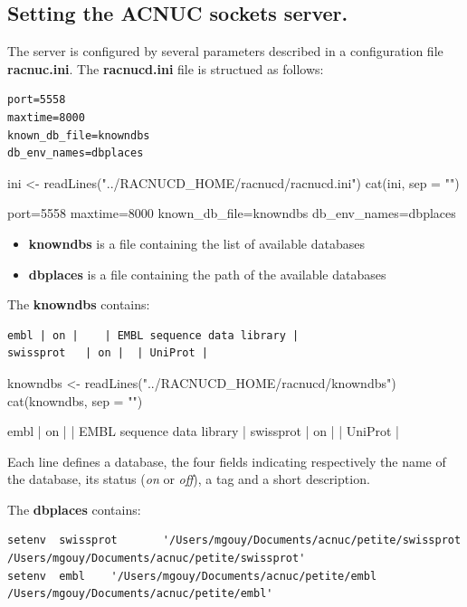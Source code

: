 \documentclass{article}
\begin{document}
\subsection{Setting the ACNUC sockets server.}
The server is configured by several parameters described in a configuration file \textbf{racnuc.ini}.
The \textbf{racnucd.ini} file is structued as follows:

\begin{verbatim}
port=5558
maxtime=8000
known_db_file=knowndbs
db_env_names=dbplaces
\end{verbatim}

\begin{Schunk}
\begin{Sinput}
 ini <- readLines("../RACNUCD_HOME/racnucd/racnucd.ini")
 cat(ini, sep = "\n")
\end{Sinput}
\begin{Soutput}
port=5558
maxtime=8000
known_db_file=knowndbs
db_env_names=dbplaces
\end{Soutput}
\end{Schunk}

\begin{itemize}
\item \textbf{knowndbs} is a file containing the list of available databases
\item \textbf{dbplaces} is a file containing the path of the available databases
\end{itemize}

The \textbf{knowndbs} contains:
\begin{verbatim}
embl | on |    | EMBL sequence data library | 
swissprot   | on |  | UniProt |
\end{verbatim}

\begin{Schunk}
\begin{Sinput}
 knowndbs <- readLines("../RACNUCD_HOME/racnucd/knowndbs")
 cat(knowndbs, sep = "\n")
\end{Sinput}
\begin{Soutput}
embl | on |    | EMBL sequence data library | 
swissprot   | on |  | UniProt |
\end{Soutput}
\end{Schunk}

Each line defines a database,  the four fields indicating respectively the name
 of the database, its status  (\textit{on} or \textit{off}), a tag and a short description.

The \textbf{dbplaces} contains:
\begin{verbatim}
setenv  swissprot       '/Users/mgouy/Documents/acnuc/petite/swissprot /Users/mgouy/Documents/acnuc/petite/swissprot'
setenv  embl    '/Users/mgouy/Documents/acnuc/petite/embl /Users/mgouy/Documents/acnuc/petite/embl'
\end{verbatim}
\end{document}
